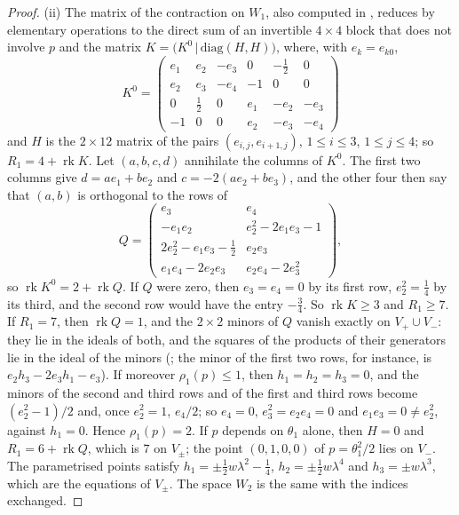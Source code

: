 \begin{proof}
(ii) The matrix of the contraction on $W_{1}$, also computed in \cite{BMB26},
reduces by elementary operations to the direct sum of an invertible
$4\times4$ block that does not involve $p$ and the matrix
$K=\bigl(K^{0}\,\big|\,\mathrm{diag}(H,H)\bigr)$, where, with $e_{k}=e_{k0}$,
\[
  K^{0}=\begin{pmatrix}
  e_{1}&e_{2}&-e_{3}&0&-\frac12&0\\
  e_{2}&e_{3}&-e_{4}&-1&0&0\\
  0&\frac12&0&e_{1}&-e_{2}&-e_{3}\\
  -1&0&0&e_{2}&-e_{3}&-e_{4}
  \end{pmatrix}
\]
and $H$ is the $2\times12$ matrix of the pairs $(e_{i,j},e_{i+1,j})$,
$1\le i\le3$, $1\le j\le4$; so $R_{1}=4+\operatorname{rk}K$. Let
$(a,b,c,d)$ annihilate the columns of $K^{0}$. The first two columns give
$d=ae_{1}+be_{2}$ and $c=-2(ae_{2}+be_{3})$, and the other four then say that
$(a,b)$ is orthogonal to the rows of
\[
  Q=\begin{pmatrix}
  e_{3}&e_{4}\\
  -e_{1}e_{2}&e_{2}^{2}-2e_{1}e_{3}-1\\
  2e_{2}^{2}-e_{1}e_{3}-\frac12&e_{2}e_{3}\\
  e_{1}e_{4}-2e_{2}e_{3}&e_{2}e_{4}-2e_{3}^{2}
  \end{pmatrix},
\]
so $\operatorname{rk}K^{0}=2+\operatorname{rk}Q$. If $Q$ were zero, then
$e_{3}=e_{4}=0$ by its first row, $e_{2}^{2}=\frac14$ by its third, and the
second row would have the entry $-\frac34$. So $\operatorname{rk}K\ge3$ and
$R_{1}\ge7$. If $R_{1}=7$, then $\operatorname{rk}Q=1$, and the $2\times2$
minors of $Q$ vanish exactly on $V_{+}\cup V_{-}$: they lie in the ideals of
both, and the squares of the products of their generators lie in the ideal of
the minors (\cite{BMB26}; the minor of the first two rows, for instance, is
$e_{2}h_{3}-2e_{3}h_{1}-e_{3}$). If moreover $\rho_{1}(p)\le1$, then
$h_{1}=h_{2}=h_{3}=0$, and the minors of the second and third rows and of the
first and third rows become $(e_{2}^{2}-1)/2$ and, once $e_{2}^{2}=1$,
$e_{4}/2$; so $e_{4}=0$, $e_{3}^{2}=e_{2}e_{4}=0$ and $e_{1}e_{3}=0\ne
e_{2}^{2}$, against $h_{1}=0$. Hence $\rho_{1}(p)=2$. If $p$ depends on
$\theta_{1}$ alone, then $H=0$ and $R_{1}=6+\operatorname{rk}Q$, which is $7$
on $V_{\pm}$; the point $(0,1,0,0)$ of $p=\theta_{1}^{2}/2$ lies on $V_{-}$.
The parametrised points satisfy $h_{1}=\pm\frac12w\lambda^{2}-\frac14$,
$h_{2}=\pm\frac12w\lambda^{4}$ and $h_{3}=\pm w\lambda^{3}$, which are the
equations of $V_{\pm}$. The space $W_{2}$ is the same with the indices
exchanged.


\end{proof}
